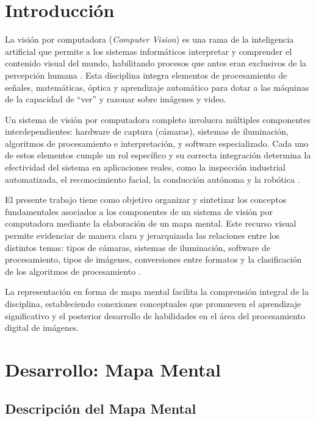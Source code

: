 \documentclass[12pt,letterpaper]{article}
\begin{document}
\section{Introducción}

La visión por computadora (\textit{Computer Vision}) es una rama de la inteligencia artificial que
permite a los sistemas informáticos interpretar y comprender el contenido visual del mundo, habilitando
procesos que antes eran exclusivos de la percepción humana \citep{gonzalez2018digital}.
Esta disciplina integra elementos de procesamiento de señales, matemáticas, óptica y aprendizaje
automático para dotar a las máquinas de la capacidad de ``ver'' y razonar sobre imágenes y video.

Un sistema de visión por computadora completo involucra múltiples componentes interdependientes:
hardware de captura (cámaras), sistemas de iluminación, algoritmos de procesamiento e interpretación,
y software especializado. Cada uno de estos elementos cumple un rol específico y su correcta
integración determina la efectividad del sistema en aplicaciones reales, como la inspección industrial
automatizada, el reconocimiento facial, la conducción autónoma y la robótica \citep{bradski2008learning}.

El presente trabajo tiene como objetivo organizar y sintetizar los conceptos fundamentales
asociados a los componentes de un sistema de visión por computadora mediante la elaboración
de un mapa mental. Este recurso visual permite evidenciar de manera clara y jerarquizada las
relaciones entre los distintos temas: tipos de cámaras, sistemas de iluminación, software de
procesamiento, tipos de imágenes, conversiones entre formatos y la clasificación de los
algoritmos de procesamiento \citep{szeliski2010computer}.

La representación en forma de mapa mental facilita la comprensión integral de la disciplina,
estableciendo conexiones conceptuales que promueven el aprendizaje significativo y el
posterior desarrollo de habilidades en el área del procesamiento digital de imágenes.

\newpage
\section{Desarrollo: Mapa Mental}

\subsection{Descripción del Mapa Mental}
\end{document}
